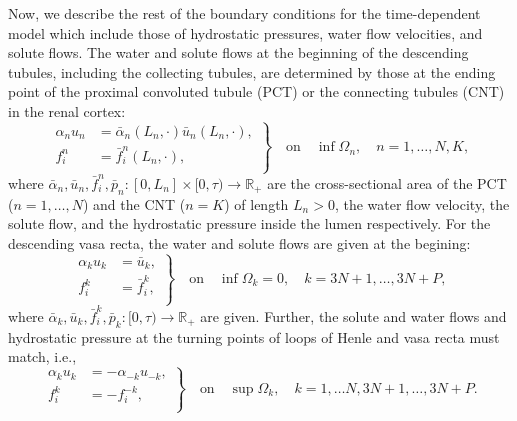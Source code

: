 \documentclass{article}
\begin{document}
Now, we describe the rest of the boundary conditions for the time-dependent model which include those of hydrostatic pressures, water flow velocities, and solute flows.
The water and solute flows at the beginning of the descending tubules, including the collecting tubules, are determined by those at the ending point of the proximal convoluted tubule (PCT) or the connecting tubules (CNT) in the renal cortex:
\begin{equation}
    \left.
    \begin{aligned}
        \alpha_n u_n &= \bar{\alpha}_n(L_n,\cdot)\bar{u}_n(L_n,\cdot),\\
        f_i^n &= \bar{f}_i^n(L_n,\cdot),\\
    \end{aligned}\right\}
    \quad\text{on}\quad \inf\Omega_n,\quad n=1,\dots,N,K,
\end{equation}
where $\bar{\alpha}_n,\bar{u}_n,\bar{f}_i^n,\bar{p}_n:[0,L_n]\times [0,\tau)\to \mathbb{R}_+$ are the cross-sectional area of the PCT ($n=1,\dots,N$) and the CNT ($n=K$) of length $L_n>0$, the water flow velocity, the solute flow, and the hydrostatic pressure inside the lumen respectively.
For the descending vasa recta, the water and solute flows are given at the begining:
\begin{equation}
    \left.
        \begin{aligned}
            \alpha_k u_k &= \bar{u}_k,\\
            f_i^k &= \bar{f}_i^k,\\
        \end{aligned}\right\}
        \quad\text{on}\quad \inf\Omega_k = 0,\quad k=3N+1,\dots,3N+P,
\end{equation}
where $\bar{\alpha}_k,\bar{u}_k,\bar{f}_i^k,\bar{p}_k:[0,\tau)\to \mathbb{R}_+$ are given.
Further, the solute and water flows and hydrostatic pressure at the turning points of loops of Henle and vasa recta must match, i.e.,
\begin{equation}
\left.
    \begin{aligned}
        \alpha_ku_k &= -\alpha_{-k}u_{-k},\\
        f_i^k &= -f_i^{-k},\\
    \end{aligned}\right\}
    \quad\text{on}\quad\sup\Omega_k,\quad k= 1,\dots N,3N+1,\dots,3N+P.
\end{equation}
\end{document}
